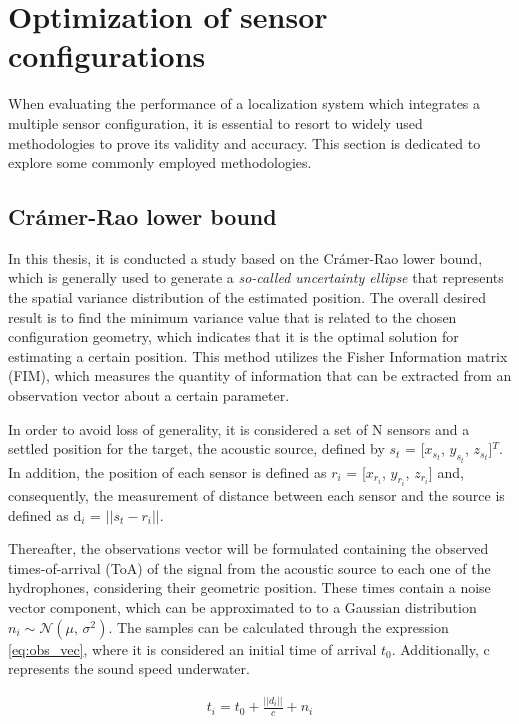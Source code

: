 \section{Optimization of sensor configurations}

When evaluating the performance of a localization system which integrates a multiple sensor configuration, it is essential to resort to widely used methodologies to prove its validity and accuracy. This section is dedicated to explore some commonly employed methodologies.

\subsection{Crámer-Rao lower bound}	\label{sec:cramer}

In this thesis, it is conducted a study based on the Crámer-Rao lower bound, which is generally used to generate a \textit{so-called uncertainty ellipse} \cite{bishop-cramer-rao} that represents the spatial variance distribution of the estimated position. The overall desired result is to find the minimum variance value that is related to the chosen configuration geometry, which indicates that it is the optimal solution for estimating a certain position. This method utilizes the Fisher Information matrix (FIM), which measures the quantity of information that can be extracted from an observation vector about a certain parameter.

In order to avoid loss of generality, it is considered a set of N sensors and a settled position for the target, the acoustic source, defined by $s_{t}$ = [$x_{s_{t}}$, $y_{s_{t}}$, $z_{s_{t}}$]$^T$. In addition, the position of each sensor is defined as $r_{i}$ = [$x_{r_{i}}$, $y_{r_{i}}$, $z_{r_{i}}$] and, consequently, the measurement of distance between each sensor and the source is defined as d$_{i}$ = $|| s_{t} - r_{i} ||$.

Thereafter, the observations vector will be formulated containing the observed times-of-arrival (ToA) of the signal from the acoustic source to each one of the hydrophones, considering their geometric position. These times contain a noise vector component, which can be approximated to to a Gaussian distribution $n_i \sim \mathcal{N}(\mu,\,\sigma^{2})$. The samples can be calculated through the expression \ref{eq:obs_vec}, where it is considered an initial time of arrival $t_0$. Additionally, c represents the sound speed underwater.

\begin{eqnarray}
	t_i = t_0 + \frac{||d_i||}{c} + n_i
	\label{eq:obs_vec}
\end{eqnarray}

